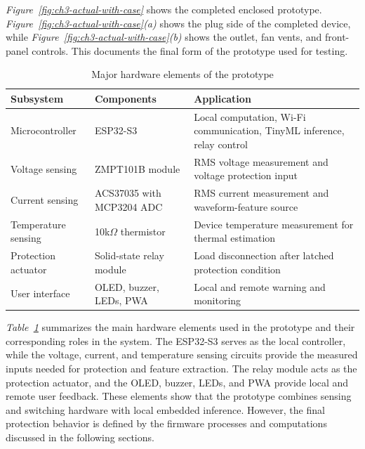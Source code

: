 \textit{Figure~\ref{fig:ch3-actual-with-case}} shows the completed enclosed prototype.
\textit{Figure~\ref{fig:ch3-actual-with-case}(a)} shows the plug side of the completed
device, while \textit{Figure~\ref{fig:ch3-actual-with-case}(b)} shows the outlet,
fan vents, and front-panel controls. This documents the final form of the prototype used for testing.
\begin{table}[H]
  \centering
  \caption{Major hardware elements of the prototype}
  \label{tab:ch3-hardware}
  \begin{tabular}{p{}p{}p{}}
    \toprule
    \textbf{Subsystem} & \textbf{Components} & \textbf{Application} \\
    \midrule
    Microcontroller & ESP32-S3 & Local computation, Wi-Fi communication, TinyML inference, relay control \\
    Voltage sensing & ZMPT101B module & RMS voltage measurement and voltage protection input \\
    Current sensing & ACS37035 with MCP3204 ADC & RMS current measurement and waveform-feature source \\
    Temperature sensing & 10k$\Omega$ thermistor & Device temperature measurement for thermal estimation \\
    Protection actuator & Solid-state relay module & Load disconnection after latched protection condition \\
    User interface & OLED, buzzer, LEDs, PWA & Local and remote warning and monitoring \\
    \bottomrule
  \end{tabular}
\end{table}

\textit{Table~\ref{tab:ch3-hardware}} summarizes the main hardware elements
used in the prototype and their corresponding roles in the system. The ESP32-S3
serves as the local controller, while the voltage, current, and temperature
sensing circuits provide the measured inputs needed for protection and feature
extraction. The relay module acts as the protection actuator, and the OLED,
buzzer, LEDs, and PWA provide local and remote user feedback. These elements 
show that the prototype combines sensing and switching hardware
with local embedded inference. However, the final protection behavior is
defined by the firmware processes and computations discussed in the following
sections.